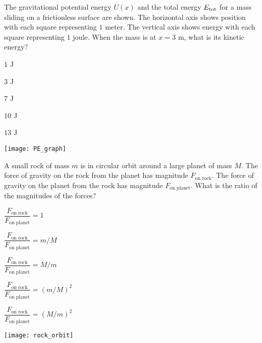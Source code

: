 \documentclass[11pt]{article}
\begin{document}
\begin{enumerate}
\begin{minipage}[t]{\lw}
\begin{minipage}[t]{.6\lw}
\item The gravitational potential energy $U(x)$ and the total energy $E_{\rm tot}$ for a mass sliding on a frictionless surface are shown. The horizontal axis shows position with each square representing $1$ meter. The vertical axis shows energy with each square representing $1$ joule. When the mass is at $x=3$ m, what is its kinetic energy?
\begin{choices}
\item $1$ J
\item $3$ J
\item $7$ J
\item $10$ J
\item $13$ J
\end{choices}
\end{minipage}\hfill
\begin{minipage}[t]{.35\lw}
\vspace{0in}
\flushright
\texttt{[image: PE\_graph]}
\end{minipage}
\end{minipage}

\begin{minipage}[t]{\lw}
\item A small rock of mass $m$ is in circular orbit around a large planet of mass $M$. The force of gravity on the rock from the planet has magnitude $F_\text{on rock}$. The force of gravity on the planet from the rock has magnitude $F_\text{on planet}$. What is the ratio of the magnitudes of the forces?\\
\begin{minipage}[t]{.65\lw}
\begin{choices}
\item $\dfrac{F_\text{on rock}}{F_\text{on planet}}=1$
\item $\dfrac{F_\text{on rock}}{F_\text{on planet}}=m/M$
\item $\dfrac{F_\text{on rock}}{F_\text{on planet}}=M/m$
\item $\dfrac{F_\text{on rock}}{F_\text{on planet}}=(m/M)^2$
\item $\dfrac{F_\text{on rock}}{F_\text{on planet}}=(M/m)^2$
\end{choices}
\end{minipage}\hfill
\begin{minipage}[t]{.3\lw}
\vspace{0in}
\flushright
\texttt{[image: rock\_orbit]}
\end{minipage}
\end{minipage}


\end{enumerate}
\end{document}
